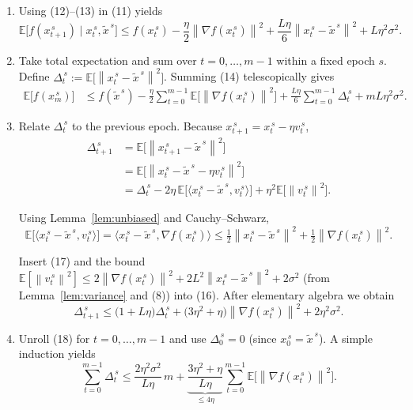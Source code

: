 \documentclass{article}
\newcommand{\E}{\mathbb{E}}
\newcommand{\norm}[1]{\left\|#1\right\|}
\newcommand{\inner}[2]{\langle #1,#2\rangle}
\newcommand{\grad}{\nabla}
\begin{document}
\begin{enumerate}
\item[Step 8.] Using (12)–(13) in (11) yields
\[
\E\!\bigl[f(x_{t+1}^{\,s})\mid x_t^{\,s},\tilde{x}^{\,s}\bigr]
\le f(x_t^{\,s})
-\frac{\eta}{2}\norm{\grad f(x_t^{\,s})}^{2}
+\frac{L\eta}{6}\norm{x_t^{\,s}-\tilde{x}^{\,s}}^{2}
+L\eta^{2}\sigma^{2}.
\tag{14}
\]

\item[Step 9.] Take total expectation and sum over $t=0,\dots,m-1$ within a fixed epoch $s$.
Define $\Delta_t^{\,s}:=\E\!\bigl[\norm{x_t^{\,s}-\tilde{x}^{\,s}}^{2}\bigr]$.  
Summing (14) telescopically gives
\[
\begin{aligned}
\E\!\bigl[f(x_{m}^{\,s})\bigr]
&\le f(\tilde{x}^{\,s})
-\frac{\eta}{2}\sum_{t=0}^{m-1}\E\!\bigl[\norm{\grad f(x_t^{\,s})}^{2}\bigr]
+\frac{L\eta}{6}\sum_{t=0}^{m-1}\Delta_t^{\,s}
+mL\eta^{2}\sigma^{2}.
\end{aligned}
\tag{15}
\]

\item[Step 10.] Relate $\Delta_t^{\,s}$ to the previous epoch.  
Because $x_{t+1}^{\,s}=x_t^{\,s}-\eta v_t^{\,s}$,
\[
\begin{aligned}
\Delta_{t+1}^{\,s}
&= \E\!\bigl[\norm{x_{t+1}^{\,s}-\tilde{x}^{\,s}}^{2}\bigr] \\
&= \E\!\bigl[\norm{x_t^{\,s}-\tilde{x}^{\,s}-\eta v_t^{\,s}}^{2}\bigr] \\
&= \Delta_t^{\,s}
-2\eta\,\E\!\bigl[\inner{x_t^{\,s}-\tilde{x}^{\,s}}{v_t^{\,s}}\bigr]
+\eta^{2}\E\!\bigl[\norm{v_t^{\,s}}^{2}\bigr].
\end{aligned}
\tag{16}
\]

Using Lemma~\ref{lem:unbiased} and Cauchy–Schwarz,
\[
\E\!\bigl[\inner{x_t^{\,s}-\tilde{x}^{\,s}}{v_t^{\,s}}\bigr]
= \inner{x_t^{\,s}-\tilde{x}^{\,s}}{\grad f(x_t^{\,s})}
\le \tfrac{1}{2}\norm{x_t^{\,s}-\tilde{x}^{\,s}}^{2}
+\tfrac{1}{2}\norm{\grad f(x_t^{\,s})}^{2}.
\tag{17}
\]

Insert (17) and the bound $\E[\norm{v_t^{\,s}}^{2}]\le 2\norm{\grad f(x_t^{\,s})}^{2}+2L^{2}\norm{x_t^{\,s}-\tilde{x}^{\,s}}^{2}+2\sigma^{2}$ (from Lemma~\ref{lem:variance} and (8)) into (16). After elementary algebra we obtain
\[
\Delta_{t+1}^{\,s}\le
\bigl(1+L\eta\bigr)\Delta_t^{\,s}
+\bigl(3\eta^{2}+ \eta\bigr)\norm{\grad f(x_t^{\,s})}^{2}
+2\eta^{2}\sigma^{2}.
\tag{18}
\]

\item[Step 11.] Unroll (18) for $t=0,\dots,m-1$ and use $\Delta_0^{\,s}=0$ (since $x_0^{\,s}=\tilde{x}^{\,s}$). A simple induction yields
\[
\sum_{t=0}^{m-1}\Delta_t^{\,s}
\le \frac{2\eta^{2}\sigma^{2}}{L\eta}\,m
+\underbrace{\frac{3\eta^{2}+\eta}{L\eta}}_{\le 4\eta}\sum_{t=0}^{m-1}\E\!\bigl[\norm{\grad f(x_t^{\,s})}^{2}\bigr].
\tag{19}
\]


\end{enumerate}
\end{document}
